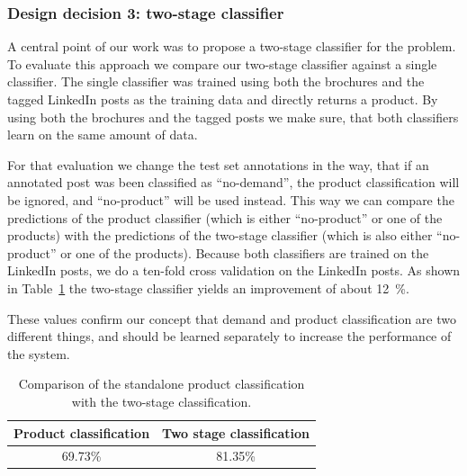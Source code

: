 \subsubsection{Design decision 3: two-stage classifier}
\label{sub:two_stage_classifier}

A central point of our work was to propose a two-stage classifier for the \nto problem.
To evaluate this approach we compare our two-stage classifier against a single classifier.
The single classifier was trained using both the brochures and the tagged LinkedIn posts as the training data and directly returns a product.
By using both the brochures and the tagged posts we make sure, that both classifiers learn on the same amount of data.

For that evaluation we change the test set annotations in the way, that if an annotated post was been classified as ``no-demand'', the product classification will be ignored, and ``no-product'' will be used instead.
This way we can compare the predictions of the product classifier (which is either ``no-product'' or one of the products) with the predictions of the two-stage classifier (which is also either ``no-product'' or one of the products).
Because both classifiers are trained on the LinkedIn posts, we do a ten-fold cross validation on the LinkedIn posts.
As shown in Table~\ref{table:two_stage_eval} the two-stage classifier yields an improvement of about 12~\%.

These values confirm our concept that demand and product classification are two different things, and should be learned separately to increase the performance of the system.

\begin{table}
	\centering
	\begin{tabular}{c|c}
		\hline
		Product classification & Two stage classification \\
		\hline \hline
		69.73\% & 81.35\% \\
		\hline
	\end{tabular}
	\caption{Comparison of the standalone product classification with the two-stage classification.}
	\label{table:two_stage_eval}
\end{table}
